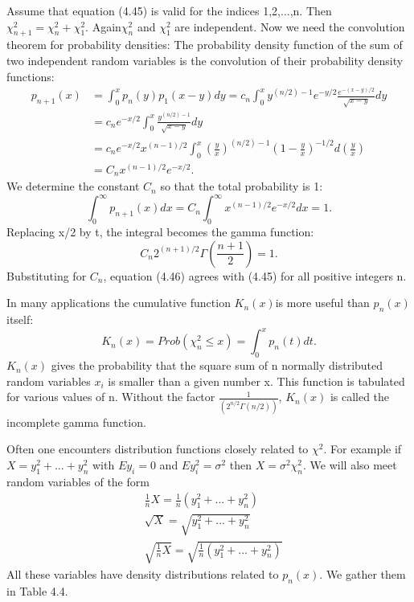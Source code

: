 	Assume that equation (4.45) is valid for the indices 1,2,...,n. Then $\chi^2_{n+1}=\chi^2_n+\chi^2_1$. Again$\chi^2_n$ and $\chi^2_1$ are independent. Now we need the convolution theorem for probability densities: The probability density function of the sum of two independent random variables is the convolution of their probability density functions:
	\begin{equation}
	\begin{split}
	p_{n+1}(x) & =\int^x_0 p_n(y)p_1(x-y)dy = c_n\int^x_0 y^{(n/2)-1}e^{-y/2}\frac{e^{-(x-y)/2}}{\sqrt{x-y}}dy \\
	&=c_ne^{-x/2}\int^x_0\frac{y^{(n/2)-1}}{\sqrt{x-y}}dy \\
	&=c_ne^{-x/2}x^{(n-1)/2}\int^x_0(\frac{y}{x})^{(n/2)-1}(1-\frac{y}{x})^{-1/2}d(\frac{y}{x})\\
	&=C_nx^{(n-1)/2}e^{-x/2}.	
	\end{split}
	\end{equation}
	We determine the constant $C_n$ so that the total probability is 1:
	\begin{equation*}
	\int^{\infty}_0p_{n+1}(x)dx=C_n\int^{\infty}_0x^{(n-1)/2}e^{-x/2}dx=1.
	\end{equation*}
	Replacing x/2 by t, the integral becomes the gamma function:
	\begin{equation*}
	C_n2^{(n+1)/2}\Gamma(\frac{n+1}{2})=1.
	\end{equation*}
	Bubstituting for $C_n$, equation (4.46) agrees with (4.45) for all positive integers n.
	
	In many applications the cumulative function $K_n(x)$is more useful than $p_n(x)$ itself:
	\begin{equation}
	K_n(x)=Prob(\chi^2_n\leq x)=\int^x_0p_n(t)dt.
	\end{equation}
	$K_n(x)$ gives the probability that the square sum of n normally distributed random variables $x_i$ is smaller than a given number x. This function is tabulated for various values
	of n. Without the factor $\frac{1}{(2^{n/2}\Gamma (n/2))}$, $K_n(x)$ is called the incomplete gamma function.
	
	Often one encounters distribution functions closely related to $\chi^2$. For example if $X=y^2_1 + ... +y^2_n$ with $E{y_i}=0$ and $E{y^2_i}=\sigma^2$ then $X=\sigma^2\chi^2_n$. We will also meet random variables of the form
	\begin{equation*}
	\begin{split}
	&\frac{1}{n}X=\frac{1}{n}(y^2_1 + ... +y^2_n)\\
	&\sqrt{X}=\sqrt{y^2_1 + ... +y^2_n}\\
	&\sqrt{\frac{1}{n}X}=\sqrt{\frac{1}{n}(y^2_1 + ... +y^2_n)}
	\end{split}
	\end{equation*}
	All these variables have density distributions related to $p_n(x)$. We gather them in Table 4.4.
	
